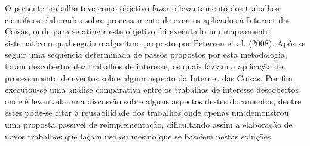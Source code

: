 \documentclass[ti,table]{texufpel} %
\begin{document}
\label{cap:Consideracoes_Finais} 

  

O presente trabalho teve como objetivo fazer o levantamento dos trabalhos científicos elaborados sobre processamento de eventos aplicados à Internet das Coisas, onde para se atingir este objetivo foi executado um mapeamento sistemático o qual seguiu o algoritmo proposto por Petersen et al. (2008). Após se seguir uma sequência determinada de passos propostos por esta metodologia, foram descobertos dez trabalhos de interesse, os quais faziam a aplicação de processamento de eventos sobre algum aspecto da Internet das Coisas. Por fim executou-se uma análise comparativa entre os trabalhos de interesse descobertos onde é levantada uma discussão sobre alguns aspectos destes documentos, dentre estes pode-se citar a reusabilidade dos trabalhos onde apenas um demonstrou uma proposta passível de reimplementação, dificultando assim a elaboração de novos trabalhos que façam uso ou mesmo que se baseiem nestas soluções. 

  


  


  


 

 

  
\end{document}
